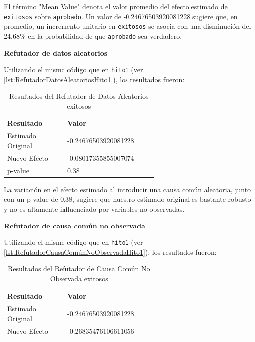 El término "Mean Value" denota el valor promedio del efecto estimado de \texttt{exitosos} sobre \texttt{aprobado}. Un valor de -0.24676503920081228 sugiere que, en promedio, un incremento unitario en \texttt{exitosos} se asocia con una disminución del 24.68\% en la probabilidad de que \texttt{aprobado} sea verdadero.

\textbf{Refutador de datos aleatorios}

Utilizando el mismo código que en \texttt{hito1} (ver \ref{lst:RefutadorDatosAleatoriosHito1}), los resultados fueron:

\begin{table}[H]
    \centering        
    \begin{tabular}{lp{0.6\linewidth}}
        \toprule
        \textbf{Resultado} & \textbf{Valor} \\
        \midrule
        Estimado Original & -0.24676503920081228 \\
        Nuevo Efecto & -0.08017355855007074 \\
        p-value & 0.38 \\
        \bottomrule
    \end{tabular}
    \caption{Resultados del Refutador de Datos Aleatorios exitosos}
    \label{tab:refutador_datos_aleatorios_exitosos}
\end{table}

La variación en el efecto estimado al introducir una causa común aleatoria, junto con un p-value de 0.38, sugiere que nuestro estimado original es bastante robusto y no es altamente influenciado por variables no observadas.

\textbf{Refutador de causa común no observada}

Utilizando el mismo código que en \texttt{hito1} (ver \ref{lst:RefutadorCausaComúnNoObservadaHito1}), los resultados fueron:

\begin{table}[H]
    \centering
    \begin{tabular}{lp{0.6\linewidth}}
        \toprule
        \textbf{Resultado} & \textbf{Valor} \\
        \midrule
        Estimado Original & -0.24676503920081228 \\
        Nuevo Efecto & -0.26835476106611056 \\
        \bottomrule
    \end{tabular}
    \caption{Resultados del Refutador de Causa Común No Observada exitosos}
    \label{tab:refutador_causa_no_observada_exitosos}
\end{table}

